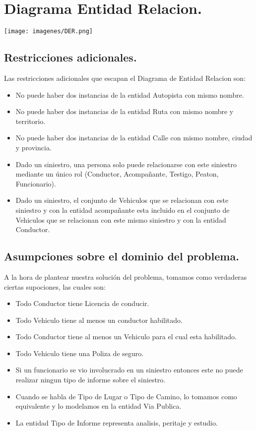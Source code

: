 \section{Diagrama Entidad Relacion.}

\texttt{[image: imagenes/DER.png]}

\subsection{Restricciones adicionales.}
Las restricciones adicionales que escapan el Diagrama de Entidad Relacion son:
\begin{itemize}
	\item No puede haber dos instancias de la entidad Autopista con mismo nombre.
	\item No puede haber dos instancias de la entidad Ruta con mismo nombre y territorio.
	\item No puede haber dos instancias de la entidad Calle con mismo nombre, ciudad y provincia.
	\item Dado un siniestro, una persona solo puede relacionarse con este siniestro mediante un único rol (Conductor, Acompañante, Testigo, Peaton, Funcionario).
	\item Dado un siniestro, el conjunto de Vehiculos que se relacionan con este siniestro y con la entidad acompañante esta incluido en el conjunto de Vehiculos que se relacionan con este mismo siniestro y con la entidad Conductor.
\end{itemize}



\subsection{Asumpciones sobre el dominio del problema.}
A la hora de plantear nuestra solución del problema, tomamos como verdaderas ciertas supociones, las cuales son:

\begin{itemize}
	\item Todo Conductor tiene Licencia de conducir.
	\item Todo Vehiculo tiene al menos un conductor habilitado.
	\item Todo Conductor tiene al menos un Vehiculo para el cual esta habilitado.
	\item Todo Vehiculo tiene una Poliza de seguro.
	\item Si un funcionario se vio involucrado en un siniestro entonces este no puede realizar ningun tipo de informe sobre el siniestro.
	\item Cuando se habla de Tipo de Lugar o Tipo de Camino, lo tomamos como equivalente y lo modelamos en la entidad Via Publica.
	\item La entidad Tipo de Informe representa analisis, peritaje y estudio.
\end{itemize}